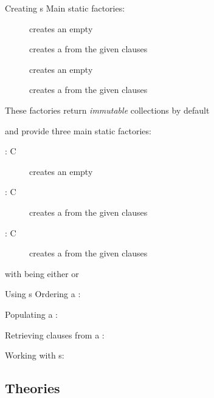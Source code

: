\documentclass[handout]{beamer}
\begin{document}
\begin{frame}[allowframebreaks]{Creating s}
    Main  static factories:
    \begin{description}
        \item[] creates an empty 
        \item[] creates a  from the given clauses
        \item[] creates an empty 
        \item[] creates a  from the given clauses
    \end{description}
    These factories return \textit{immutable} collections by default

    \framebreak

     and  provide three main static factories:
    \begin{description}
        \item[: C] creates an empty 
        \item[: C] creates a  from the given clauses
        \item[: C] creates a  from the given clauses
    \end{description}
    with  being either  or 
\end{frame}

\begin{frame}[allowframebreaks]{Using s}
    Ordering a :

    \framebreak

    Populating a :

    \framebreak

    Retrieving clauses from a :

    \framebreak

    Working with s:
\end{frame}

\subsection{Theories}
\end{document}
